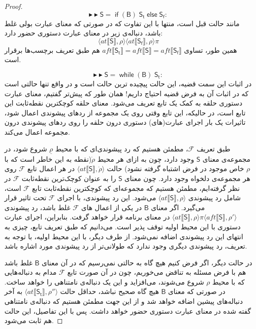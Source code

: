 \begin{proof}
$$\blacktriangleright\blacktriangleright \mathsf{S=\; if\;(B)\;S_t\;else\;S_f}:$$
مانند حالت قبل است، منتها با این تفاوت که در صورتی که معنای عبارت بولی غلط باشد، دنباله‌ی زیر در معنای عبارت‌ دستوری حضور دارد:
	$$\langle at \llbracket \mathsf{S} \rrbracket , \rho \rangle
\langle at \llbracket \mathsf{S_f} \rrbracket , \rho \rangle \pi$$
همین ‌طور، تساوی 
$aft \llbracket \mathsf{S_t} \rrbracket=aft \llbracket \mathsf{S} \rrbracket=aft \llbracket \mathsf{S_f} \rrbracket$
هم طبق تعریف برچسب‌ها برقرار است.

$$\blacktriangleright\blacktriangleright \mathsf{S=\; while\;(B)\;S_t}:$$
در اثبات این سمت قضیه، این حالت پیچیده ترین حالت است و در واقع تنها حالتی است که در اثبات آن به فرض قضیه احتیاج داریم! همان طور که پیش‌تر گفتیم، معنای عبارت دستوری حلقه به کمک یک تابع تعریف می‌شود. معنای حلقه کوچکترین نقطه‌ثابت این تابع است، در حالیکه، این تابع وقتی روی یک مجموعه از ردهای پیشوندی اعمال شود، تاثیرات یک بار اجرای عبارت‌(های) دستوری درون حلقه را روی ردهای پیشوندی درون مجموعه اعمال می‌کند.

طبق تعریف $\mathcal{F}$، مطمئن هستیم که رد پیشوندی‌ای که با محیط $\underline{\rho}$ شروع شود، در مجموعه‌ی معنای $\mathsf{S}$ وجود دارد، چون به ازای هر محیط $\dot{\rho}$(نقطه به این خاطر است که با $\rho$ خاص موجود در فرض اشتباه گرفته نشود) حالت 
$\langle at \llbracket \mathsf{S} \rrbracket, \dot{\rho} \rangle$
 در هر اعمال تابع $\mathcal{F}$ روی هر مجموعه‌ی دلخواه وجود دارد. چون معنای $\mathsf{S}$ را به عنوان کوچک‌ترین نقطه‌ثابت $\mathcal{F}$ در نظر گرفته‌ایم، مطمئن هستیم که مجموعه‌ای که کوچکترین نقطه‌ثابت تابع $\mathcal{F}$ است، شامل رد پیشوندی 
 $\langle at \llbracket \mathsf{S} \rrbracket, \rho \rangle$
 می‌شود. این رد پیشوندی، با اجرای $\mathcal{F}$ تحت تاثیر قرار می‌گیرد. اگر معنای $\mathsf{B}$ در یکی از اعمال های $\mathcal{F}$ غلط باشد، رد پیشوندی
$ \langle at \llbracket \mathsf{S} \rrbracket, \rho \rangle \pi \langle aft \llbracket \mathsf{S} \rrbracket , \rho' \rangle$ 
در معنای برنامه قرار خواهد گرفت. بنابراین، اجرای عبارت‌ دستوری با این محیط اولیه توقف پذیر است. می‌دانیم که طبق تعریف تابع، چیزی به انتهای این رد پیشوندی اضافه نمی‌شود. از طرف دیگر، با این محیط اولیه، با توجه به تعریف، رد پیشوندی دیگری وجود ندارد که طولانی‌تر از رد پیشوندی مورد اشاره باشد. 

در حالت دیگر، اگر فرض کنیم هیچ گاه به حالتی نمی‌رسیم که در آن معنای $\mathsf{B}$ غلط باشد هم با فرض مسئله به تناقض می‌خوریم، چون در آن صورت تابع $\mathcal{F}$ مدام به دنباله‌‌هایی که با محیط $\rho$ شروع می‌شوند، می‌افزاید و این یک دنباله‌ی نامتناهی را خواهد ساخت. در صورتی که معنای $\mathsf{B}$ هیچ گاه صحیح نباشد، حداقل حالت 
$\langle at \llbracket \mathsf{S_t} \rrbracket , \rho'' \rangle$
به آخر دنباله‌های پیشین اضافه خواهد شد و از این جهت مطمئن هستیم که دنباله‌ی نامتناهی گفته شده در معنای عبارت‌ دستوری حضور خواهد داشت. پس با این تفاصیل، این حالت هم ثابت می‌شود.


\end{proof}
